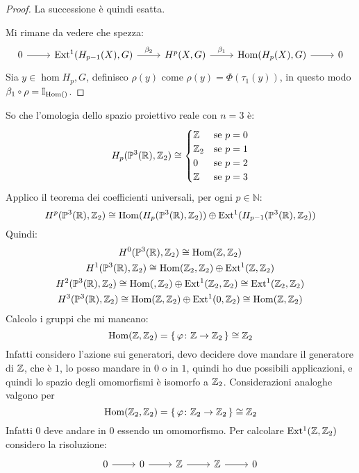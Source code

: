 \begin{proof}
  La successione è quindi esatta.

  Mi rimane da vedere che spezza:
  \[
    \begin{tikzcd}
      0 \rar & \ext{H_{p-1}(X), G} \rar{\beta_2} & H^p(X,G) \rar{\beta_1} & \hom{H_p(X), G} \rar & 0
    \end{tikzcd}
  \]
  Sia $ y \in \hom{H_p, G} $, definisco $ \rho(y) $ come $ \rho(y) = \Phi(\tau_1(y)) $, in questo modo
  $ \beta_1 \circ \rho = \Id{\hom{}} $.
\end{proof}

\begin{example}
  So che l'omologia dello spazio proiettivo reale con $ n = 3 $ è:
  \[
    H_p(\mathbb{P}^3 (\mathbb{R}), \mathbb{Z}_2) \cong
    \begin{cases}
      \mathbb{Z} & \text{se } p = 0 \\
      \mathbb{Z}_2 & \text{se } p = 1 \\
      0 & \text{se } p = 2 \\
      \mathbb{Z} & \text{se } p = 3
    \end{cases}
  \]
  Applico il teorema dei coefficienti universali, per ogni $ p \in \mathbb{N} $:
  \[
    H^p(\mathbb{P}^3 (\mathbb{R}), \mathbb{Z}_2) \cong \mathrm{Hom}( H_p(\mathbb{P}^3 (\mathbb{R}), \mathbb{Z}_2)) \oplus \mathrm{Ext^1}( H_{p-1}(\mathbb{P}^3 (\mathbb{R}), \mathbb{Z}_2))
  \]
  Quindi:
  \begin{gather*}
    H^0(\mathbb{P}^3 (\mathbb{R}), \mathbb{Z}_2) \cong \mathrm{Hom}( \mathbb{Z}, \mathbb{Z}_2) \\
    H^1(\mathbb{P}^3 (\mathbb{R}), \mathbb{Z}_2) \cong \mathrm{Hom}( \mathbb{Z}_2, \mathbb{Z}_2) \oplus \mathrm{Ext^1}( \mathbb{Z}, \mathbb{Z}_2) \\
    H^2(\mathbb{P}^3 (\mathbb{R}), \mathbb{Z}_2) \cong \mathrm{Hom}( , \mathbb{Z}_2) \oplus \mathrm{Ext^1}( \mathbb{Z}_2, \mathbb{Z}_2) \cong \mathrm{Ext^1}( \mathbb{Z}_2, \mathbb{Z}_2) \\
    H^3(\mathbb{P}^3 (\mathbb{R}), \mathbb{Z}_2) \cong \mathrm{Hom}( \mathbb{Z}, \mathbb{Z}_2) \oplus \mathrm{Ext^1}( 0, \mathbb{Z}_2) \cong \mathrm{Hom}( \mathbb{Z}, \mathbb{Z}_2) \\
  \end{gather*}
  Calcolo i gruppi che mi mancano:
  \[
    \mathrm{Hom}( \mathbb{Z}, \mathbb{Z}_2) = \set{\varphi\colon \mathbb{Z}\to \mathbb{Z}_2 } \cong \mathbb{Z}_2
  \]
  Infatti considero l'azione sui generatori, devo decidere dove mandare il generatore di $ \mathbb{Z} $,
  che è $ 1 $, lo posso mandare in $ 0 $ o in $ 1 $, quindi ho due possibili applicazioni, e quindi
  lo spazio degli omomorfismi è isomorfo a $ \mathbb{Z}_2 $. Considerazioni analoghe valgono per
  \[
    \mathrm{Hom}( \mathbb{Z}_2, \mathbb{Z}_2) = \set{\varphi\colon \mathbb{Z}_2 \to \mathbb{Z}_2 } \cong \mathbb{Z}_2
  \]
  Infatti $ 0 $ deve andare in $ 0 $ essendo un omomorfismo.
  Per calcolare $ \mathrm{Ext^1}( \mathbb{Z}, \mathbb{Z}_2) $ considero la risoluzione:
  \[
    \begin{tikzcd}
      0 \rar & 0 \rar & \Z \rar & \Z \rar & 0
    \end{tikzcd}
\]
\end{example}
